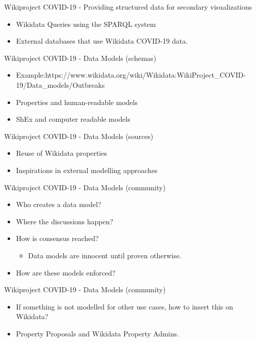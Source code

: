\documentclass{beamer}
\begin{document}
\begin{frame}{Wikiproject COVID-19 - Providing structured data for secondary visualizations}
\begin{itemize}
    \item Wikidata Queries using the SPARQL system 
    \item External databases that use Wikidata COVID-19 data.
\end{itemize}
\end{frame}



\begin{frame}{Wikiproject COVID-19 - Data Models (schemas) }
\begin{itemize}
    \item Example:https://www.wikidata.org/wiki/Wikidata:WikiProject\_COVID-19/Data\_models/Outbreaks
    \item Properties and human-readable models
    \item ShEx and computer readable models
\end{itemize}
\end{frame}

\begin{frame}{Wikiproject COVID-19 - Data Models (sources)}
\begin{itemize}
    \item Reuse of Wikidata properties
    \item Inspirations in external modelling approaches
\end{itemize}
\end{frame}

\begin{frame}{Wikiproject COVID-19 - Data Models (community)}
\begin{itemize}
    \item Who creates a data model?
    \item Where the discussions happen?
    \item How is consensus reached?
    \begin{itemize}
        \item Data models are innocent until proven otherwise.
    \end{itemize}
    \item How are these models enforced?
\end{itemize}
\end{frame}

\begin{frame}{Wikiproject COVID-19 - Data Models (community)}
\begin{itemize}
    \item If something is not modelled for other use cases, how to insert this on Wikidata?
    \item Property Proposals and Wikidata Property Admins.
\end{itemize}
\end{frame}
\end{document}
